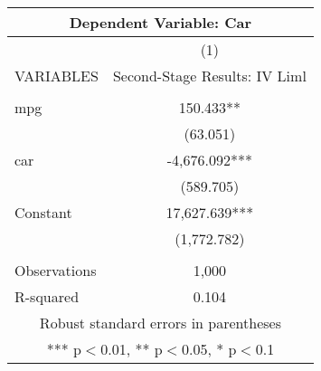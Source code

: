 \documentclass[]{article}
\begin{document}
\begin{tabular}{lc}
\multicolumn{2}{c}{Dependent Variable: Car} \\ \hline
 & (1) \\
VARIABLES & Second-Stage Results: IV Liml \\ \hline
 &  \\
mpg & 150.433** \\
 & (63.051) \\
car & -4,676.092*** \\
 & (589.705) \\
Constant & 17,627.639*** \\
 & (1,772.782) \\
 &  \\
Observations & 1,000 \\
 R-squared & 0.104 \\ \hline
\multicolumn{2}{c}{ Robust standard errors in parentheses} \\
\multicolumn{2}{c}{ *** p$<$0.01, ** p$<$0.05, * p$<$0.1} \\
\end{tabular}
\end{document}
